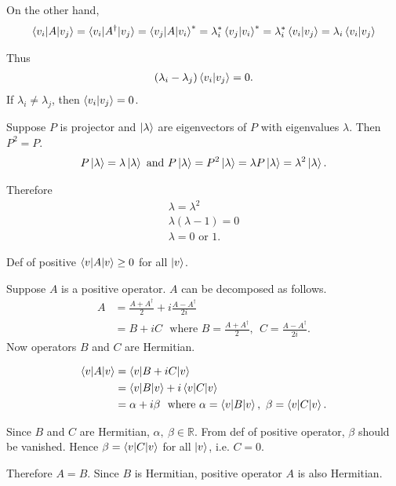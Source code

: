 On the other hand,
\begin{align*}
	\braket{v_i | A | v_j} = \braket{v_i | A^\dagger | v_j}
	= \braket{v_j | A | v_i}^*
	= \lambda_i^* \braket{v_j | v_i}^*
	=  \lambda_i^* \braket{v_i | v_j}
	=  \lambda_i \braket{v_i | v_j}
\end{align*}

Thus
\begin{align*}
	(\lambda_i - \lambda_j) \braket{v_i | v_j}  = 0.
\end{align*}
If $\lambda_i \neq \lambda_j$, then $\braket{v_i | v_j}  = 0$.


Suppose $P$ is projector and $\ket{\lambda}$  are eigenvectors of $P$ with eigenvalues $\lambda$.
Then $P^2 = P$.
\begin{align*}
	P \ket{\lambda} = \lambda \ket{\lambda} \text{ and }	P \ket{\lambda} = P^2 \ket{\lambda} = \lambda  P \ket{\lambda} = \lambda^2 \ket{\lambda}.
\end{align*}

Therefore
\begin{align*}
	\lambda = \lambda^2\\
	\lambda (\lambda - 1) = 0\\
	\lambda = 0 \text{ or } 1.
\end{align*}


Def of positive $\braket{v | A | v} \geq 0$ for all $\ket{v}$.

Suppose $A$ is a positive operator. $A$ can be decomposed as follows.
\begin{align*}
	A &= \frac{A + A^\dagger}{2} + i \frac{A - A^\dagger}{2i}\\
		&= B + i C  ~~~\text{where } B =\frac{A + A^\dagger}{2}, ~~  C = \frac{A - A^\dagger}{2i}.
\end{align*}
Now operators $B$ and $C$ are Hermitian.

\begin{align*}
	\braket{v | A | v}  &= \braket{v | B + iC | v}\\
		&= \braket{v | B | v}  + i \braket{v | C | v}\\
		&= \alpha + i \beta ~~ \text{where } \alpha = \braket{v | B | v}, ~\beta = \braket{v | C | v}.
\end{align*}

Since $B$ and $C$ are Hermitian, $\alpha,~ \beta \in \mathds{R}$.
From def of positive operator, $\beta$ should be vanished.
Hence $\beta = \braket{v | C | v}$ for all $\ket{v}$, i.e. $C = 0$.

Therefore $A = B$. Since $B$ is Hermitian, positive operator $A$ is also Hermitian.


